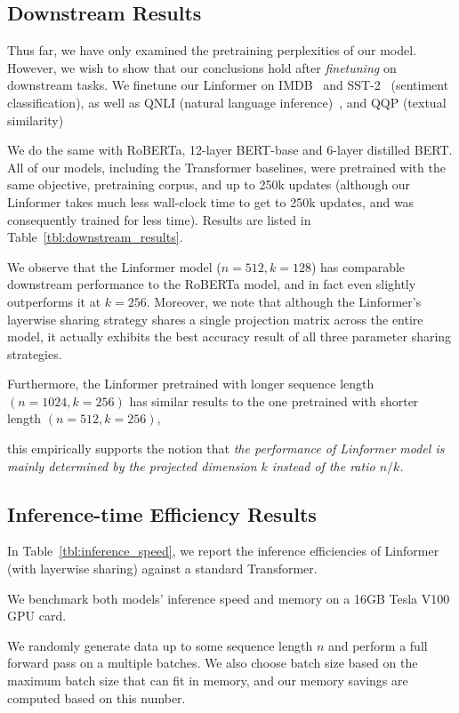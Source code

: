 \subsection{Downstream Results}

Thus far, we have only examined the pretraining perplexities of our model. However, we wish to show that our conclusions hold after \textit{finetuning} on downstream tasks. We finetune our Linformer on IMDB~\citep{maas2011learning} and SST-2~\citep{socher2013recursive} (sentiment classification), as well as QNLI (natural language inference)~\citep{rajpurkar2016squad}, and QQP (textual similarity)~\citep{chen2018quora}

We do the same with RoBERTa, 12-layer BERT-base and 6-layer distilled BERT. All of our models, including the Transformer baselines, were pretrained with the same objective, pretraining corpus, and up to 250k updates (although our Linformer takes much less wall-clock time to get to 250k updates, and was consequently trained for less time). Results are listed in Table~\ref{tbl:downstream_results}.

We observe that the Linformer model ($n=512, k=128$) has comparable downstream performance to the RoBERTa model, and in fact even slightly outperforms it at $k=256$. Moreover, we note that although the Linformer's layerwise sharing strategy shares a single projection matrix across the entire model, it actually exhibits the best accuracy result of all three parameter sharing strategies.

Furthermore, the Linformer pretrained with longer sequence length $(n=1024, k=256)$ has similar results to the one pretrained with shorter length $(n=512, k=256)$,

this empirically supports the notion that \textit{the performance of Linformer model is mainly determined by the projected dimension $k$ instead of the ratio $n/k$.}

\subsection{Inference-time Efficiency Results}

In Table~\ref{tbl:inference_speed},
we report the inference efficiencies of Linformer (with layerwise sharing) against a standard Transformer. 

We benchmark both models' inference speed and memory on a 16GB Tesla V100 GPU card. 

We randomly generate data up to some sequence length $n$ and perform a full forward pass on a multiple batches. We also choose batch size based on the maximum batch size that can fit in memory, and our memory savings are computed based on this number.

